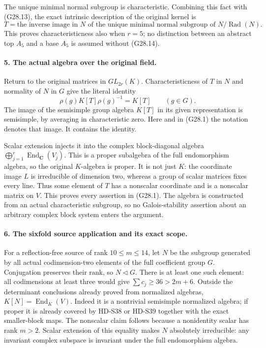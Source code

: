 The unique minimal normal subgroup is characteristic.
Combining this fact with (G28.13), the exact intrinsic
description of the original kernel is
\[
 T=\text{the inverse image in }N\text{ of the unique minimal
 normal subgroup of }N/\operatorname{Rad}(N).               \tag{G28.15}
\]
This proves characteristicness also when \(r=5\); no
distinction between an abstract top \(A_5\) and a base
\(A_5\) is assumed without (G28.14).

\paragraph{5. The actual algebra over the original field.}
Return to the original matrices in \(GL_{2r}(K)\).
Characteristicness of \(T\) in \(N\) and normality of
\(N\) in \(G\) give the literal identity
\[
          \rho(g)K[T]\rho(g)^{-1}=K[T]\qquad(g\in G).
                                                               \tag{G28.16}
\]
The image of the semisimple group algebra \(K[T]\) in its
given representation is semisimple, by averaging in
characteristic zero. Here and in (G28.1) the notation denotes
that image. It contains the identity.

Scalar extension injects it into the complex block-diagonal
algebra \(\bigoplus_{j=1}^r\operatorname{End}_{\mathbf C}(V_j)\).
This is a proper subalgebra of the full endomorphism algebra,
so the original \(K\)-algebra is proper. It is not just
\(K\): the coordinate image \(L\) is irreducible of
dimension two, whereas a group of scalar matrices fixes
every line. Thus some element of \(T\) has a nonscalar
coordinate and is a nonscalar matrix on \(V\).
This proves every assertion in (G28.1). The algebra is
constructed from an actual characteristic subgroup, so no
Galois-stability assertion about an arbitrary complex block
system enters the argument.

\paragraph{6. The sixfold source application and its exact scope.}
For a reflection-free source of rank \(10\le m\le14\),
let \(N\) be the subgroup generated by all actual
codimension-two elements of the full coefficient group \(G\).
Conjugation preserves their rank, so \(N\triangleleft G\).
There is at least one such element: all codimensions at least
three would give \(\sum c_j\ge36>2m+6\).
Outside the determinant conclusions already proved from
normalized algebras, \(K[N]=\operatorname{End}_K(V)\).
Indeed it is a nontrivial semisimple normalized algebra;
if proper it is already covered by HD-S38 or HD-S39 together
with the exact smaller-block maps. The nonscalar claim follows
because a nonidentity scalar has rank \(m>2\).
Scalar extension of this equality makes \(N\) absolutely
irreducible: any invariant complex subspace is invariant under
the full endomorphism algebra.

